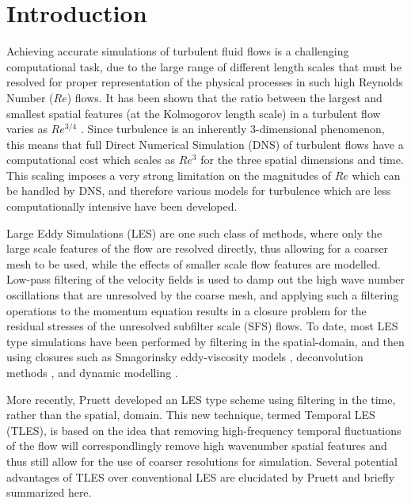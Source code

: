 \chapter{Introduction}


Achieving accurate simulations of turbulent fluid flows is a challenging computational task, due to the large range of different length scales that must be resolved for proper representation of the physical processes in such high Reynolds Number ($Re$) flows. It has been shown that the ratio between the largest and smallest spatial features (at the Kolmogorov length scale) in a turbulent flow varies as $Re^{3/4}$ \cite{Pruett2008}. Since turbulence is an inherently 3-dimensional phenomenon, this means that full Direct Numerical Simulation (DNS) of turbulent flows have a computational cost which scales as $Re^3$ for the three spatial dimensions and time. This scaling imposes a very strong limitation on the magnitudes of $Re$ which can be handled by DNS, and therefore various models for turbulence which are less computationally intensive have been developed.

Large Eddy Simulations (LES) are one such class of methods, where only the large scale features of the flow are resolved directly, thus allowing for a coarser mesh to be used, while the effects of smaller scale flow features are modelled. Low-pass filtering of the velocity fields is used to damp out the high wave number oscillations that are unresolved by the coarse mesh, and applying such a filtering operations to the momentum equation results in a closure problem for the residual stresses of the unresolved subfilter scale (SFS) flows. To date, most LES type simulations have been performed by filtering in the spatial-domain, and then using closures such as Smagorinsky eddy-viscosity models \cite{Smagorinsky1963}, deconvolution methods \cite{Stolz1999}, and dynamic modelling \cite{Germano1991}.

More recently, Pruett \cite{Pruett2000} developed an LES type scheme using filtering in the time, rather than the spatial, domain. This new technique, termed Temporal LES (TLES), is based on the idea that removing high-frequency temporal fluctuations of the flow will correspondlingly remove high wavenumber spatial features and thus still allow for the use of coarser resolutions for simulation. Several potential advantages of TLES over conventional LES are elucidated by Pruett and briefly summarized here.

